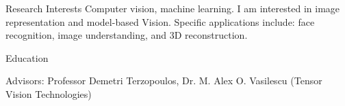 \documentclass{resume}
\begin{document}
\maketitle
\thispagestyle{empty} %

\vspace{-0.5em}

\begin{component}{Research Interests}
Computer vision, machine learning.
I am interested in image representation and model-based Vision.
Specific applications include: face recognition, image understanding, and 3D reconstruction.
\end{component}

\vspace{0.5em}

\begin{component}{Education}

    \hspace{2em} Advisors: Professor Demetri Terzopoulos, Dr. M. Alex O. Vasilescu (Tensor Vision Technologies)

\end{component}

\vspace{0.5em}
\end{document}
